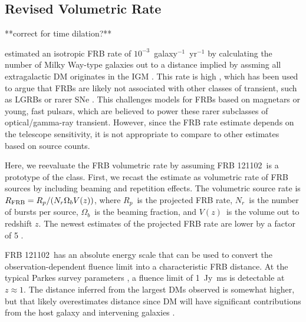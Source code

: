 \documentclass[twocolumn]{aastex61}
\newcommand{\frb}{FRB 121102}
\begin{document}
\subsection{Revised Volumetric Rate}

**correct for time dilation?**

\citet{2013Sci...341...53T} estimated an isotropic FRB rate of $10^{-3}$\ galaxy$^{-1}$\ yr$^{-1}$ by calculating the number of Milky Way-type galaxies out to a distance implied by assming all extragalactic DM originates in the IGM \citep[$z\approx0.9$\ for $DM\approx z\times900 \rm{pc}\ \rm{cm}^{-3}$;][]{2003ApJ...598L..79I,2004MNRAS.348..999I}. This rate is high \citep[comparable to the rate of core-collapse supernovae;][]{2006Natur.439...45D}, which has been used to argue that FRBs are likely not associated with other classes of transient, such as LGRBs or rarer SNe \citep{2006ARA&A..44..507W}. This challenges models for FRBs based on magnetars or young, fast pulsars, which are believed to power these rarer subclasses of optical/gamma-ray transient. However, since the FRB rate estimate depends on the telescope sensitivity, it is not appropriate to compare to other estimates based on source counts.

Here, we reevaluate the FRB volumetric rate by assuming \frb\ is a prototype of the class. First, we recast the estimate as volumetric rate of FRB sources by including beaming and repetition effects. The volumetric source rate is $R_{\rm{FRB}} = R_p /(N_r \Omega_b V (z))$, where $R_p$\ is the projected FRB rate, $N_r$\ is the number of bursts per source, $\Omega_b$\ is the beaming fraction, and $V(z)$\ is the volume out to redshift $z$. The newest estimates of the projected FRB rate are lower by a factor of 5 \citep[$2\times10^3\ \rm{sky}^{-1} \rm{day}^{-1}$\ at high Galactic latitudes and flux densities brighter than 1~Jy~ms; ][]{2016arXiv161100458L, 2016MNRAS.460L..30C, 2016MNRAS.455.2207R}. 

\frb\ has an absolute energy scale that can be used to convert the observation-dependent fluence limit into a characteristic FRB distance. At the typical Parkes survey parameters \citep[e.g.,][]{2016MNRAS.460L..30C}, a fluence limit of 1~Jy~ms is detectable at $z\approx1$. The distance inferred from the largest DMs observed \citep[$\sim1500$\ pc cm$^{-3}$;][]{2016MNRAS.460L..30C} is somewhat higher, but that likely overestimates distance since DM will have significant contributions from the host galaxy and intervening galaxies \citep{OPT, 2014ApJ...780L..33M}.
\end{document}
